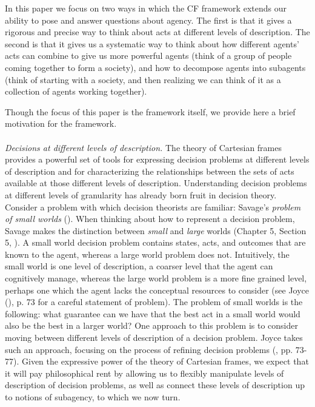 \documentclass{article}
\begin{document}
In this paper we focus on two ways in which the CF framework extends our ability to pose and answer questions about agency. The first is that it gives a rigorous and precise way to think about acts at different levels of description. The second is that it gives us a systematic way to think about how different agents' acts can combine to give us more powerful agents (think of a group of people coming together to form a society), and how to decompose agents into subagents (think of starting with a society, and then realizing we can think of it as a collection of agents working together). 

Though the focus of this paper is the framework itself, we provide here a brief motivation for the framework.
\\
\\
\noindent \textit{Decisions at different levels of description.} The theory of Cartesian frames provides a powerful set of tools for expressing decision problems at different levels of description and for characterizing the relationships between the sets of acts available at those different levels of description. Understanding decision problems at different levels of granularity has already born fruit in decision theory. Consider a problem with which decision theorists are familiar: Savage's \textit{problem of small worlds} (\cite{savage1972foundations}). When thinking about how to represent a decision problem, Savage makes the distinction between \textit{small} and \textit{large} worlds (Chapter 5, Section 5, \citeyear{savage1972foundations}). A small world decision problem contains states, acts, and outcomes that are known to the agent, whereas a large world problem does not. Intuitively, the small world is one level of description, a coarser level that the agent can cognitively manage, whereas the large world problem is a more fine grained level, perhaps one which the agent lacks the conceptual resources to consider (see Joyce (\citeyear{joyce1999foundations}), p. 73 for a careful statement of problem). The problem of small worlds is the following: what guarantee can we have that the best act in a small world would also be the best in a larger world? One approach to this problem is to consider moving between different levels of description of a decision problem. Joyce takes such an approach, focusing on the process of refining decision problems (\cite{joyce1999foundations}, pp. 73-77). Given the expressive power of the theory of Cartesian frames, we expect that it will pay philosophical rent by allowing us to flexibly manipulate levels of description of decision problems, as well as connect these levels of description up to notions of subagency, to which we now turn. 
\\
\\
\end{document}
